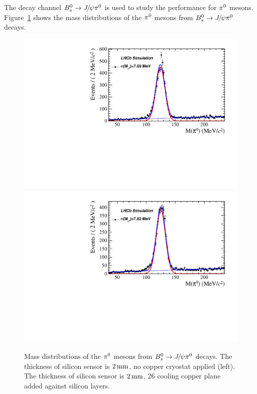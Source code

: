 The decay channel ${{B}^0_{s}}\rightarrow{\ensuremath{{J\mskip -3mu/\mskip -2mu\psi}}}{\ensuremath{{\pi}^0}}$ is used to study the performance for ${{\pi}^0}$ mesons.
Figure~\ref{fig:piz_mass_B2Jpsipiz} shows the mass distributions of the ${{\pi}^0}$ mesons from ${{B}^0_{s}}\rightarrow{\ensuremath{{J\mskip -3mu/\mskip -2mu\psi}}}{\ensuremath{{\pi}^0}}$ decays.
\begin{figure}[!htbp]
  \begin{center}
    \includegraphics[width=0.49\linewidth]{Figures/06_ECAL/Bs_JpsiPi0/Bs_JpsiPiz/low_lumi/0_2/pi0_M.pdf}
    \includegraphics[width=0.49\linewidth]{Figures/06_ECAL/Bs_JpsiPi0/Bs_JpsiPiz/low_lumi/Cu_0_2/pi0_M.pdf}
    \vspace*{-0.5cm}
  \end{center}
  \caption{
      Mass distributions of the ${{\pi}^0}$ mesons from ${{B}^0_{s}}\rightarrow{\ensuremath{{J\mskip -3mu/\mskip -2mu\psi}}}{\ensuremath{{\pi}^0}}$ decays. 
      The thickness of silicon sensor is $2\text{\,mm}$, no copper cryostat applied (left). 
      The thickness of silicon sensor is $2\text{\,mm}$, 26 cooling copper plane added against silicon layers.
  }
  \label{fig:piz_mass_B2Jpsipiz}
\end{figure}
